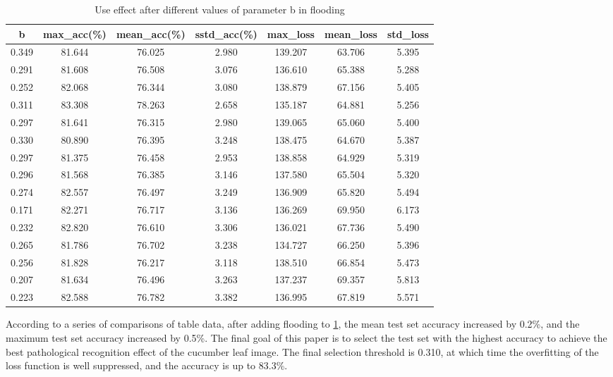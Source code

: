 \documentclass[a4paper,fleqn]{cas-sc}
\begin{document}
\begin{table}
\centering
\caption{Use effect after different values of parameter b in flooding}
\label{tab:mbv4}
\begin{tabular}{ccccccc}
\hline 
b & max\_acc(\%) & mean\_acc(\%) & sstd\_acc(\%) & max\_loss & mean\_loss & std\_loss \\
\hline  
0.349   & 81.644 &  76.025  & 2.980 &  139.207  & 63.706 & 5.395 \\
 0.291   & 81.608  & 76.508 & 3.076 &  136.610  & 65.388 & 5.288 \\
 0.252   & 82.068   & 76.344 & 3.080 &  138.879  & 67.156 & 5.405 \\
 0.311  & 83.308   & 78.263 & 2.658 &  135.187  & 64.881 & 5.256 \\
 0.297  &  81.641  & 76.315 & 2.980 &  139.065  & 65.060 & 5.400 \\
 0.330  & 80.890  & 76.395 & 3.248 & 138.475   & 64.670 & 5.387 \\
 0.297  & 81.375  & 76.458 &    2.953  & 138.858 & 64.929&5.319 \\
 0.296  & 81.568  & 76.385 & 3.146 &  137.580  & 65.504 & 5.320 \\
 0.274  & 82.557 &  76.497  & 3.249 &  136.909  & 65.820 & 5.494 \\
 0.171   & 82.271  & 76.717 & 3.136 &  136.269  & 69.950 & 6.173 \\
 0.232   & 82.820   & 76.610 & 3.306 &  136.021  & 67.736 & 5.490 \\
 0.265  & 81.786   & 76.702 & 3.238 &  134.727  & 66.250 & 5.396 \\
 0.256  &  81.828  & 76.217 & 3.118 &  138.510  & 66.854 & 5.473 \\
 0.207  & 81.634  & 76.496 & 3.263 &  137.237  & 69.357 & 5.813 \\
 0.223  & 82.588  & 76.782 & 3.382 &  136.995  & 67.819 & 5.571 \\
\hline
\end{tabular}
\end{table}

According to a series of comparisons of table data, after adding flooding to \ref{tab:mbv4}, the mean test set accuracy increased by 0.2\%, and the maximum test set accuracy increased by 0.5\%. The final goal of this paper is to select the test set with the highest accuracy to achieve the best pathological recognition effect of the cucumber leaf image. The final selection threshold is 0.310, at which time the overfitting of the loss function is well suppressed, and the accuracy is up to 83.3\%.
\end{document}
